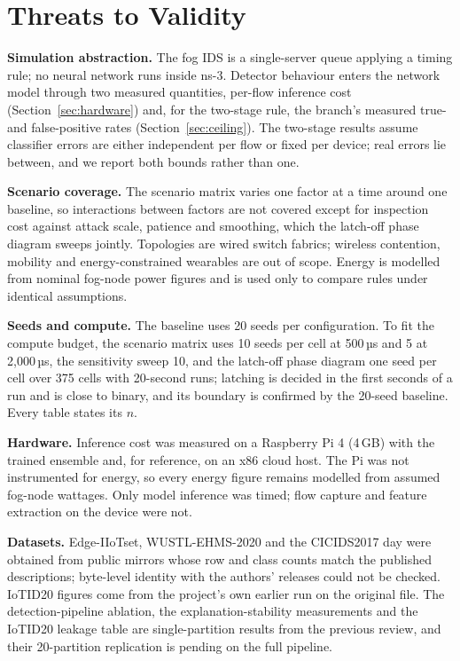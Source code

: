 \section{Threats to Validity}\label{sec:limits}
\noindent\textbf{Simulation abstraction.} The fog IDS is a single-server queue applying a timing rule; no neural network runs inside ns-3. Detector behaviour enters the network model through two measured quantities, per-flow inference cost (Section~\ref{sec:hardware}) and, for the two-stage rule, the branch's measured true- and false-positive rates (Section~\ref{sec:ceiling}). The two-stage results assume classifier errors are either independent per flow or fixed per device; real errors lie between, and we report both bounds rather than one.

\noindent\textbf{Scenario coverage.} The scenario matrix varies one factor at a time around one baseline, so interactions between factors are not covered except for inspection cost against attack scale, patience and smoothing, which the latch-off phase diagram sweeps jointly. Topologies are wired switch fabrics; wireless contention, mobility and energy-constrained wearables are out of scope. Energy is modelled from nominal fog-node power figures and is used only to compare rules under identical assumptions.

\noindent\textbf{Seeds and compute.} The baseline uses 20 seeds per configuration. To fit the compute budget, the scenario matrix uses 10 seeds per cell at 500\,µs and 5 at 2,000\,µs, the sensitivity sweep 10, and the latch-off phase diagram one seed per cell over 375 cells with 20-second runs; latching is decided in the first seconds of a run and is close to binary, and its boundary is confirmed by the 20-seed baseline. Every table states its $n$.

\noindent\textbf{Hardware.} Inference cost was measured on a Raspberry Pi 4 (4\,GB) with the trained ensemble and, for reference, on an x86 cloud host. The Pi was not instrumented for energy, so every energy figure remains modelled from assumed fog-node wattages. Only model inference was timed; flow capture and feature extraction on the device were not.

\noindent\textbf{Datasets.} Edge-IIoTset, WUSTL-EHMS-2020 and the CICIDS2017 day were obtained from public mirrors whose row and class counts match the published descriptions; byte-level identity with the authors' releases could not be checked. IoTID20 figures come from the project's own earlier run on the original file. The detection-pipeline ablation, the explanation-stability measurements and the IoTID20 leakage table are single-partition results from the previous review, and their 20-partition replication is pending on the full pipeline.


